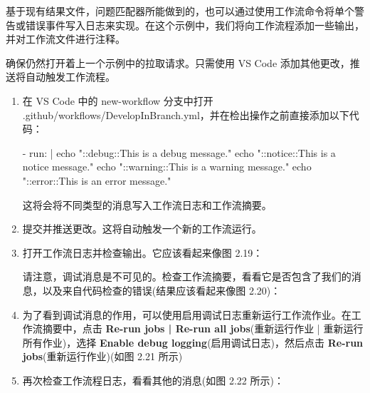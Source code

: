 
基于现有结果文件，问题匹配器所能做到的，也可以通过使用工作流命令将单个警告或错误事件写入日志来实现。在这个示例中，我们将向工作流程添加一些输出，并对工作流文件进行注释。


确保仍然打开着上一个示例中的拉取请求。只需使用 VS Code 添加其他更改，推送将自动触发工作流程。


\begin{enumerate}
\item 
在 VS Code 中的 new-workflow 分支中打开 .github/workflows/DevelopInBranch.yml，并在检出操作之前直接添加以下代码：

\begin{shell}
- run: |
  echo "::debug::This is a debug message."
  echo "::notice::This is a notice message."
  echo "::warning::This is a warning message."
  echo "::error::This is an error message."
\end{shell}

这将会将不同类型的消息写入工作流日志和工作流摘要。

\item 
提交并推送更改。这将自动触发一个新的工作流运行。

\item 
打开工作流日志并检查输出。它应该看起来像图 2.19：


请注意，调试消息是不可见的。检查工作流摘要，看看它是否包含了我们的消息，以及来自代码检查的错误(结果应该看起来像图 2.20)：


\item 
为了看到调试消息的作用，可以使用启用调试日志重新运行工作流作业。在工作流摘要中，点击 \textbf{Re-run jobs | Re-run all jobs}(重新运行作业 | 重新运行所有作业)，选择 \textbf{ Enable debug logging}(启用调试日志)，然后点击 \textbf{Re-run jobs}(重新运行作业)(如图 2.21 所示)


\item 
再次检查工作流程日志，看看其他的消息(如图 2.22 所示)：



\end{enumerate}
